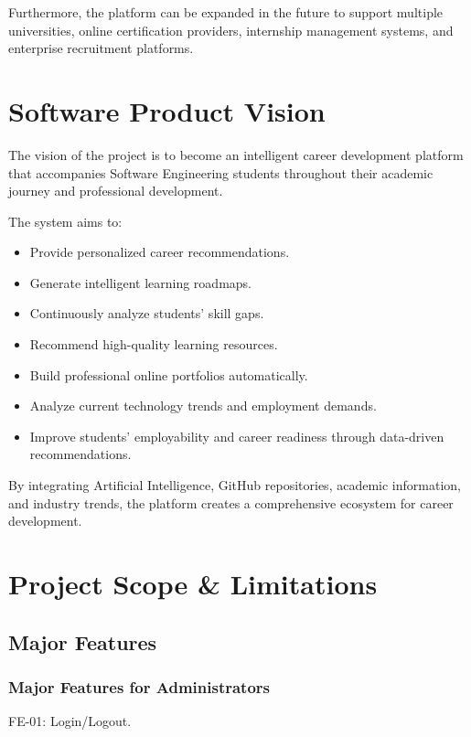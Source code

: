 Furthermore, the platform can be expanded in the future to support multiple universities, online certification providers, internship management systems, and enterprise recruitment platforms. 

\section{Software Product Vision}
The vision of the project is to become an intelligent career development platform that accompanies Software Engineering students throughout their academic journey and professional development. 

The system aims to: 

\begin{itemize}
    \item Provide personalized career recommendations.  
    \item Generate intelligent learning roadmaps.  
    \item Continuously analyze students' skill gaps.
    \item Recommend high-quality learning resources.  
    \item Build professional online portfolios automatically.  
    \item Analyze current technology trends and employment demands.
    \item Improve students' employability and career readiness through data-driven recommendations.  
\end{itemize}

By integrating Artificial Intelligence, GitHub repositories, academic information, and industry trends, the platform creates a comprehensive ecosystem for career development. 

\section{Project Scope \& Limitations}

\subsection{Major Features}

\subsubsection{Major Features for Administrators}

FE-01: Login/Logout. 

